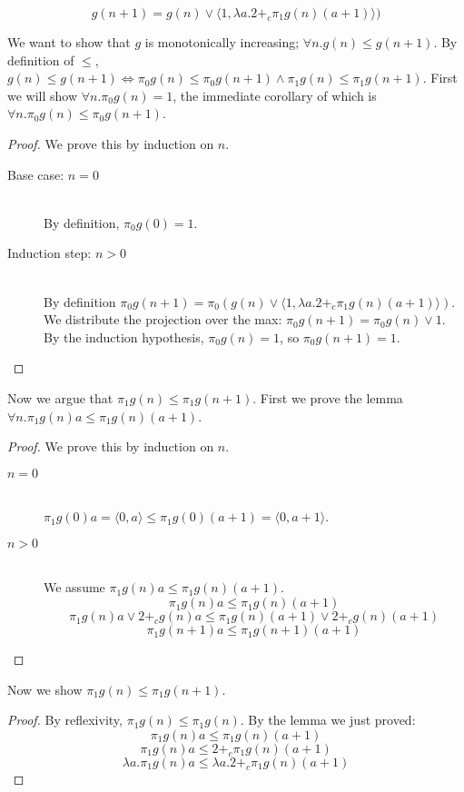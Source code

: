 \[ g(n+1) = g(n) \vee \langle 1, \lambda a. 2 +_c \pi_1g(n) (a+1)\rangle)\]

We want to show that $g$ is monotonically increasing; $\forall n.g(n) \leq g(n+1)$.
By definition of $\leq$, $g(n) \leq g(n+1) \Leftrightarrow \pi_0 g(n) \leq \pi_0 g(n+1) \land \pi_1 g(n) \leq \pi_1 g(n+1)$.
First we will show $\forall n. \pi_0 g(n) = 1$, the immediate corollary of which is $\forall n. \pi_0 g(n) \leq \pi_0 g(n+1)$.
\begin{proof}
We prove this by induction on $n$.
  \begin{description}
    \item[Base case: $n=0$]\hfill \\
      By definition, $\pi_0 g(0) = 1$.
    \item[Induction step: $n>0$]\hfill \\
      By definition $\pi_0 g(n+1) = \pi_0 (g(n) \vee \langle 1, \lambda a. 2 +_c \pi_1g(n) (a+1)\rangle)$.
      We distribute the projection over the max: $\pi_0 g(n+1) = \pi_0 g(n) \vee 1$.
      By the induction hypothesis, $\pi_0 g(n) = 1$, so $\pi_0 g(n+1) = 1$.
  \end{description}
\end{proof}
Now we argue that $\pi_1g(n) \leq \pi_1 g(n+1)$.
First we prove the lemma $\forall n.\pi_1 g(n) a \leq \pi_1 g(n) (a+1)$.
\begin{proof}
  We prove this by induction on $n$.
  \begin{description}
    \item[$n=0$]\hfill \\
      $\pi_1 g(0) a = \langle 0,a\rangle \leq \pi_1 g(0) (a+1) = \langle 0,a+1 \rangle$.
    \item[$n>0$]\hfill \\
      We assume $\pi_1 g(n) a \leq \pi_1 g(n) (a+1)$.
      \[ \pi_1 g(n) a \leq \pi_1 g(n) (a+1) \]
      \[ \pi_1 g(n) a \vee 2 +_c g(n) a \leq \pi_1 g(n) (a+1) \vee 2 +_c g(n) (a+1) \]
      \[ \pi_1 g(n+1) a \leq \pi_1 g(n+1) (a+1) \]
  \end{description}
\end{proof}

Now we show $\pi_1 g(n) \leq \pi_1 g(n+1)$.
\begin{proof}
  By reflexivity, $\pi_1 g(n) \leq \pi_1 g(n)$.
  By the lemma we just proved:
  \[ \pi_1 g(n) a \leq \pi_1 g(n) (a+1) \]
  \[ \pi_1 g(n) a \leq 2 +_c \pi_1 g(n) (a+1) \]
  \[ \lambda a.\pi_1 g(n) a \leq \lambda a. 2 +_c \pi_1 g(n) (a+1) \]
\end{proof}

